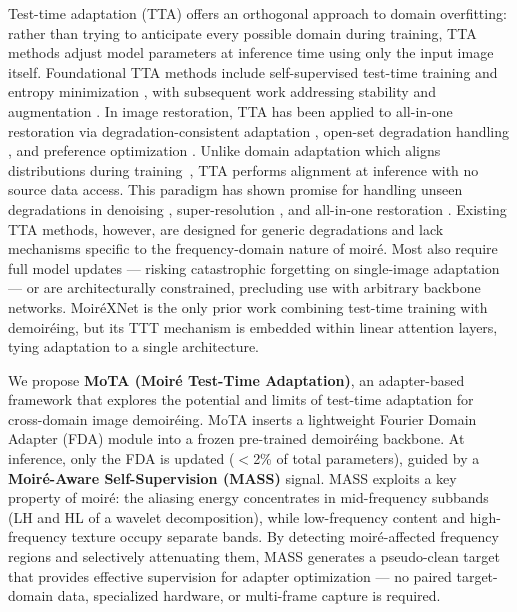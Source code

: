 \documentclass[review,10pt]{elsarticle}
\begin{document}
Test-time adaptation (TTA) offers an orthogonal approach to domain overfitting: rather than trying to anticipate every possible domain during training, TTA methods adjust model parameters at inference time using only the input image itself. Foundational TTA methods include self-supervised test-time training \cite{sun2020ttt} and entropy minimization \cite{wang2021tent}, with subsequent work addressing stability \cite{niu2023towards} and augmentation \cite{zhang2022memo}. In image restoration, TTA has been applied to all-in-one restoration via degradation-consistent adaptation \cite{tang2026degradation}, open-set degradation handling \cite{gou2024testtime}, and preference optimization \cite{li2026testtime}. Unlike domain adaptation which aligns distributions during training~\cite{ganin2016domain,kouw2019review}, TTA performs alignment at inference with no source data access. This paradigm has shown promise for handling unseen degradations in denoising \cite{mansour2024tttmim}, super-resolution \cite{deng2023efficient}, and all-in-one restoration \cite{tang2026degradation}. Existing TTA methods, however, are designed for generic degradations and lack mechanisms specific to the frequency-domain nature of moir\'{e}. Most also require full model updates --- risking catastrophic forgetting on single-image adaptation --- or are architecturally constrained, precluding use with arbitrary backbone networks. Moir\'{e}XNet \cite{li2025moirexnet} is the only prior work combining test-time training with demoir\'{e}ing, but its TTT mechanism is embedded within linear attention layers, tying adaptation to a single architecture.

We propose \textbf{MoTA (Moir\'{e} Test-Time Adaptation)}, an adapter-based framework that explores the potential and limits of test-time adaptation for cross-domain image demoir\'{e}ing. MoTA inserts a lightweight Fourier Domain Adapter (FDA) module into a frozen pre-trained demoir\'{e}ing backbone. At inference, only the FDA is updated ($<$2\% of total parameters), guided by a \textbf{Moir\'{e}-Aware Self-Supervision (MASS)} signal. MASS exploits a key property of moir\'{e}: the aliasing energy concentrates in mid-frequency subbands (LH and HL of a wavelet decomposition), while low-frequency content and high-frequency texture occupy separate bands. By detecting moir\'{e}-affected frequency regions and selectively attenuating them, MASS generates a pseudo-clean target that provides effective supervision for adapter optimization --- no paired target-domain data, specialized hardware, or multi-frame capture is required.
\end{document}
